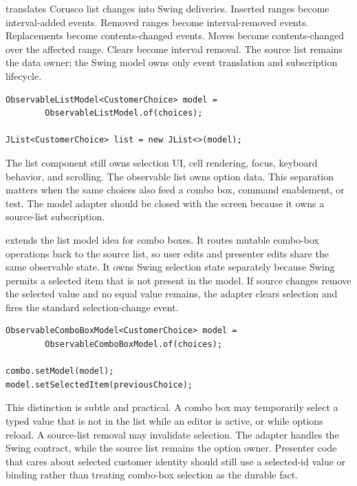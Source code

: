  translates Corusco list changes into Swing
 deliveries. Inserted ranges become interval-added events.
Removed ranges become interval-removed events. Replacements become
contents-changed events. Moves become contents-changed over the affected range.
Clears become interval removal. The source list remains the data owner; the
Swing model owns only event translation and subscription lifecycle.

\begin{lstlisting}[caption={A JList can display a presenter-owned row source.}]
ObservableListModel<CustomerChoice> model =
        ObservableListModel.of(choices);

JList<CustomerChoice> list = new JList<>(model);
\end{lstlisting}

The list component still owns selection UI, cell rendering, focus, keyboard
behavior, and scrolling. The observable list owns option data. This separation
matters when the same choices also feed a combo box, command enablement, or test.
The model adapter should be closed with the screen because it owns a source-list
subscription.

 extends the list model idea for combo boxes. It
routes mutable combo-box operations back to the source list, so user edits and
presenter edits share the same observable state. It owns Swing selection state
separately because Swing permits a selected item that is not present in the
model. If source changes remove the selected value and no equal value remains,
the adapter clears selection and fires the standard selection-change event.

\begin{lstlisting}[caption={Combo-box model selection is not list membership.}]
ObservableComboBoxModel<CustomerChoice> model =
        ObservableComboBoxModel.of(choices);

combo.setModel(model);
model.setSelectedItem(previousChoice);
\end{lstlisting}

This distinction is subtle and practical. A combo box may temporarily select a
typed value that is not in the list while an editor is active, or while options
reload. A source-list removal may invalidate selection. The adapter handles the
Swing contract, while the source list remains the option owner. Presenter code
that cares about selected customer identity should still use a selected-id value
or binding rather than treating combo-box selection as the durable fact.

